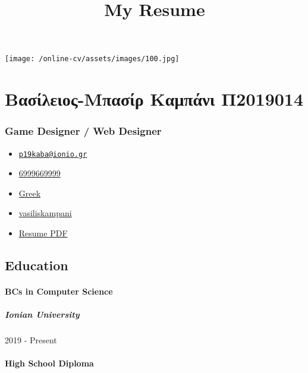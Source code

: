 \documentclass[english,]{article}
\title{My Resume}
\date{}
\providecommand{\tightlist}{%
  \setlength{\itemsep}{0pt}\setlength{\parskip}{0pt}}
\let\oldparagraph\paragraph
\renewcommand{\paragraph}[1]{\oldparagraph{#1}\mbox{}}
\let\oldsubparagraph\subparagraph
\renewcommand{\subparagraph}[1]{\oldsubparagraph{#1}\mbox{}}
\begin{document}
\maketitle

\texttt{[image: /online-cv/assets/images/100.jpg]}

\hypertarget{ux3b2ux3b1ux3c3ux3afux3bbux3b5ux3b9ux3bfux3c2-ux3bcux3c0ux3b1ux3c3ux3afux3c1-ux3baux3b1ux3bcux3c0ux3acux3bdux3b9-ux3c02019014}{%
\section{Βασίλειος-Μπασίρ Καμπάνι
Π2019014}\label{ux3b2ux3b1ux3c3ux3afux3bbux3b5ux3b9ux3bfux3c2-ux3bcux3c0ux3b1ux3c3ux3afux3c1-ux3baux3b1ux3bcux3c0ux3acux3bdux3b9-ux3c02019014}}

\hypertarget{game-designer-web-designer}{%
\subsubsection{Game Designer / Web
Designer}\label{game-designer-web-designer}}

\begin{itemize}
\tightlist
\item
  \emph{} \href{mailto:p19kaba@ionio.gr}{\nolinkurl{p19kaba@ionio.gr}}
\item
  \emph{} \href{tel:6999669999}{6999669999}
\item
  \emph{} \href{}{Greek}
\item
  \emph{} \href{http://github.com/vasiliskampani}{vasiliskampani}
\item
  \emph{} \href{http://www.africau.edu/images/default/sample.pdf}{Resume
  PDF}
\end{itemize}

\hypertarget{education}{%
\subsection{Education}\label{education}}

\hypertarget{bcs-in-computer-science}{%
\paragraph{BCs in Computer Science}\label{bcs-in-computer-science}}

\hypertarget{ionian-university}{%
\subparagraph{Ionian University}\label{ionian-university}}

2019 - Present

\hypertarget{high-school-diploma}{%
\paragraph{High School Diploma}\label{high-school-diploma}}
\end{document}
